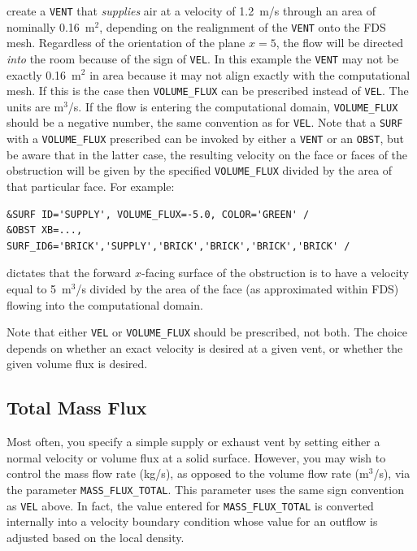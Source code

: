 \documentclass[11pt]{book}
\newcommand{\ct}{\tt\small}
\begin{document}
\noindent
create a {\ct VENT} that {\em supplies} air at a velocity of 1.2~m/s through an area of nominally 0.16~m$^2$, depending on the
realignment of the {\ct VENT} onto the FDS mesh. Regardless of the
orientation of the plane $x=5$, the flow will be directed {\em into} the room because of the sign of {\ct VEL}.
In this example the {\ct VENT} may not be exactly
0.16~m$^2$ in area because it may not align exactly with the computational mesh. If this is the case then
{\ct VOLUME\_FLUX} can be prescribed instead of {\ct VEL}. The units
are m$^3$/s. If the flow is entering the computational domain, {\ct VOLUME\_FLUX}
should be a negative number, the same convention as for {\ct VEL}. Note that a {\ct SURF}
with a {\ct VOLUME\_FLUX} prescribed can be invoked by either a
{\ct VENT} or an {\ct OBST}, but be aware that in the latter case, the resulting
velocity on the face or faces of the obstruction will be given by the specified
{\ct VOLUME\_FLUX} divided by the area of that particular face. For example:

\footnotesize
\begin{verbatim}
&SURF ID='SUPPLY', VOLUME_FLUX=-5.0, COLOR='GREEN' /
&OBST XB=..., SURF_ID6='BRICK','SUPPLY','BRICK','BRICK','BRICK','BRICK' /
\end{verbatim}
\normalsize

\noindent
dictates that the forward $x$-facing surface of the obstruction is to have a velocity
equal to 5~m$^3$/s divided by the area of the face (as approximated within FDS) flowing into the
computational domain.

\begin{warning}
\noindent
Note that either {\ct VEL} or {\ct VOLUME\_FLUX} should be prescribed,
not both.  The choice depends on whether an exact velocity is desired at a
given vent, or whether the given volume flux is desired.
\end{warning}

\subsection{Total Mass Flux}

\label{info:MASS_FLUX_TOTAL}

Most often, you specify a simple supply or exhaust vent by setting either a normal velocity or volume flux at
a solid surface. However, you may wish to control the mass flow rate (kg/s), as opposed to the volume flow
rate (m$^3$/s), via the parameter {\ct MASS\_FLUX\_TOTAL}. This parameter uses the same sign convention as {\ct VEL} above.  In fact, the value entered for
{\ct MASS\_FLUX\_TOTAL} is converted internally into a velocity boundary condition whose value
for an outflow is adjusted based on the local density.
\end{document}
